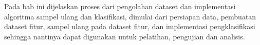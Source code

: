 Pada bab ini dijelaskan proses dari pengolahan dataset dan implementasi
algoritma sampel ulang dan klasifikasi, dimulai dari persiapan
data, pembuatan dataset fitur, sampel ulang pada dataset fitur, dan
implementasi pengklasifikasi sehingga nantinya dapat digunakan untuk pelatihan,
pengujian dan analisis.
